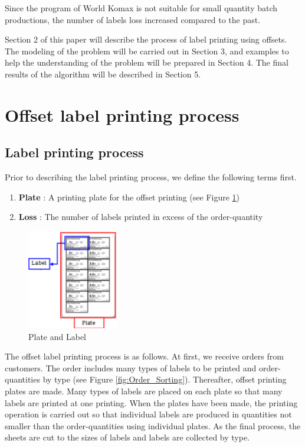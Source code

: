 Since the program of World Komax is not suitable for small quantity batch productions, the number of labels loss increased compared to the past.

Section 2 of this paper will describe the process of label printing using offsets. The modeling of the problem will be carried out in Section 3, and examples to help the understanding of the problem will be prepared in Section 4. The final results of the algorithm will be described in Section 5. 


\section{Offset label printing process}\label{sec:Offset}

\subsection{Label printing process}\label{subsec:LabelPrinting}
Prior to describing the label printing process, we define the following terms first.
\begin{enumerate}[*]
	\item {\bf Plate} : A printing plate for the offset printing (see Figure \ref{fig:PlateLabel})
	\item {\bf Loss} : The number of labels printed in excess of the order-quantity
\end{enumerate}

\begin{figure}
	\includegraphics[width=4cm]{PlateLabel.pdf}
	\caption{Plate and Label}
	\label{fig:PlateLabel}       %
\end{figure}

The offset label printing process is as follows. At first, we receive orders from customers. The order includes many types of labels to be printed and order-quantities by type (see Figure \ref{fig:Order_Sorting}). Thereafter, offset printing plates are made. Many types of labels are placed on each plate so that many labels are printed at one printing. When the plates have been made, the printing operation is carried out so that individual labels are produced in quantities not smaller than the order-quantities using individual plates. As the final process, the sheets are cut to the sizes of labels and labels are collected by type.

